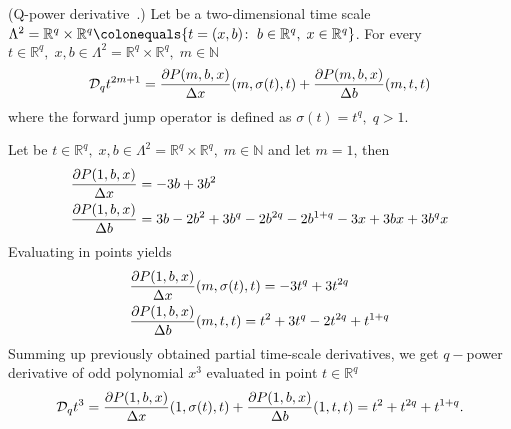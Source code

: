 \begin{cor}
    \label{q_power_derivative_case}
    (Q-power derivative~\cite{aldwoah2011power}.)
    Let be a two-dimensional time scale
    $\Lambda^2 = {\mathbb{R}}^{q} \times {\mathbb{R}}^{q} \colonequals \{t=(x,b) \colon \; b\in {\mathbb{R}}^{q}, \; x\in{\mathbb{R}}^{q} \}$.
    For every $t\in {\mathbb{R}}^{q}, \; x,b\in\Lambda^2 = {\mathbb{R}}^{q} \times {\mathbb{R}}^{q}, \; m\in\mathbb{N}$
    \begin{align*}
        \mathcal{D}_q t^{2m+1}
        = \frac{\partial P ( m, b, x )}{\Delta x}(m, \sigma(t), t)
        + \frac{\partial P ( m, b, x )}{\Delta b}(m, t, t)
    \end{align*}
    where the forward jump operator is defined as $\sigma(t) = t^q, \; q > 1$.
\end{cor}
\begin{examp}
    \label{time_scale_nq_example_1}
    Let be $t\in {\mathbb{R}}^{q}, \; x,b\in\Lambda^2 = {\mathbb{R}}^{q} \times {\mathbb{R}}^{q}, \; m\in\mathbb{N}$
    and let $m=1$, then
    \begin{align*}
        &\frac{\partial P ( 1, b, x )}{\Delta x} = -3 b + 3 b^2 \\
        &\frac{\partial P ( 1, b, x )}{\Delta b} = 3 b - 2 b^2 + 3 b^q - 2 b^{2 q} - 2 b^{1 + q} - 3 x + 3 b x + 3 b^q x
    \end{align*}
    Evaluating in points yields
    \begin{align*}
        &\frac{\partial P ( 1, b, x )}{\Delta x} (m, \sigma(t), t) = -3 t^q + 3 t^{2 q} \\
        &\frac{\partial P ( 1, b, x )}{\Delta b} (m, t, t) = t^2 + 3 t^q - 2 t^{2 q} + t^{1 + q}
    \end{align*}
    Summing up previously obtained partial time-scale derivatives, we get $q-$power derivative of odd polynomial
    $x^{3}$ evaluated in point $t \in {\mathbb{R}}^{q}$
    \begin{align*}
        \mathcal{D}_q t^{3}
        = \frac{\partial P ( 1, b, x )}{\Delta x} (1, \sigma(t), t)
        + \frac{\partial P ( 1, b, x )}{\Delta b} (1, t, t)
        = t^2 + t^{2 q} + t^{1 + q}.
    \end{align*}
\end{examp}
